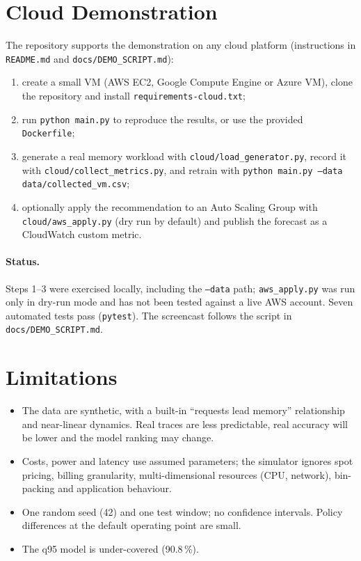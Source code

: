 \documentclass[11pt,a4paper]{article}
\begin{document}
\section{Cloud Demonstration}\label{sec:cloud}
The repository supports the demonstration on any cloud platform (instructions in \texttt{README.md} and \texttt{docs/DEMO\_SCRIPT.md}):
\begin{enumerate}
  \item create a small VM (AWS EC2, Google Compute Engine or Azure VM), clone the repository and install \texttt{requirements-cloud.txt};
  \item run \texttt{python main.py} to reproduce the results, or use the provided \texttt{Dockerfile};
  \item generate a real memory workload with \texttt{cloud/load\_generator.py}, record it with \texttt{cloud/collect\_metrics.py}, and retrain with \texttt{python main.py --data data/collected\_vm.csv};
  \item optionally apply the recommendation to an Auto Scaling Group with \texttt{cloud/aws\_apply.py} (dry run by default) and publish the forecast as a CloudWatch custom metric.
\end{enumerate}
\paragraph{Status.} Steps 1--3 were exercised locally, including the \texttt{--data} path; \texttt{aws\_apply.py} was run only in dry-run mode and has not been tested against a live AWS account. Seven automated tests pass (\texttt{pytest}). The screencast follows the script in \texttt{docs/DEMO\_SCRIPT.md}.

\section{Limitations}
\begin{itemize}
  \item The data are synthetic, with a built-in ``requests lead memory'' relationship and near-linear dynamics. Real traces are less predictable, real accuracy will be lower and the model ranking may change.
  \item Costs, power and latency use assumed parameters; the simulator ignores spot pricing, billing granularity, multi-dimensional resources (CPU, network), bin-packing and application behaviour.
  \item One random seed (42) and one test window; no confidence intervals. Policy differences at the default operating point are small.
  \item The q95 model is under-covered (90.8\,\%).
\end{itemize}
\end{document}
